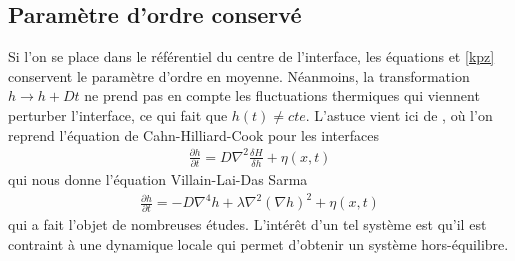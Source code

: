     \subsection{Paramètre d'ordre conservé}

Si l'on se place dans le référentiel du centre de l'interface, les équations \cite{edwards-wilkinson-conesrved} et \ref{kpz} conservent le paramètre d'ordre en moyenne. Néanmoins, la transformation $h \rightarrow h + Dt$ ne prend pas en compte les fluctuations thermiques qui viennent perturber l'interface, ce qui fait que $h(t) \neq cte$. L'astuce vient ici de \cite{kawasaki_diffusion_1966,kawasaki_correlation-function_1966}, où l'on reprend l'équation de Cahn-Hilliard-Cook pour les interfaces
\begin{align}
    \frac{\partial h}{\partial t} = D \nabla^2 \frac{\delta H}{\delta h} +  \eta(x,t)
\end{align}
qui nous donne l'équation Villain-Lai-Das Sarma\cite{villain_continuum_1991,lai_kinetic_1991}
\begin{align}
    \frac{\partial h}{\partial t} = - D \nabla^4 h + \lambda \nabla^2 (\nabla h) ^2 +  \eta(x,t)
\end{align}
qui a fait l'objet de nombreuses études\cite{kim_conserved_1994,assis_dynamic_2015,oliveira_maximal-_2008,singha_renormalization_2016}.
L'intérêt d'un tel système est qu'il est contraint à une dynamique locale qui permet d'obtenir un système hors-équilibre. 

